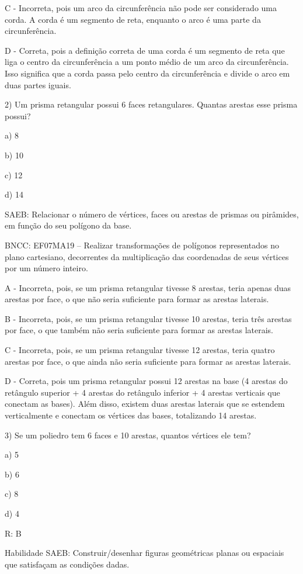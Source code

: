 C - Incorreta, pois um arco da circunferência não pode ser considerado
uma corda. A corda é um segmento de reta, enquanto o arco é uma parte da
circunferência.

D - Correta, pois a definição correta de uma corda é um segmento de reta
que liga o centro da circunferência a um ponto médio de um arco da
circunferência. Isso significa que a corda passa pelo centro da
circunferência e divide o arco em duas partes iguais.

2) Um prisma retangular possui 6 faces retangulares. Quantas arestas
esse prisma possui?

a) 8

b) 10

c) 12

d) 14

SAEB: Relacionar o número de vértices, faces ou arestas de prismas ou
pirâmides, em função do seu polígono da base.

BNCC: EF07MA19 -- Realizar transformações de polígonos representados no
plano cartesiano, decorrentes da multiplicação das coordenadas de seus
vértices por um número inteiro.

A - Incorreta, pois, se um prisma retangular tivesse 8 arestas, teria
apenas duas arestas por face, o que não seria suficiente para formar as
arestas laterais.

B - Incorreta, pois, se um prisma retangular tivesse 10 arestas, teria
três arestas por face, o que também não seria suficiente para formar as
arestas laterais.

C - Incorreta, pois, se um prisma retangular tivesse 12 arestas, teria
quatro arestas por face, o que ainda não seria suficiente para formar as
arestas laterais.

D - Correta, pois um prisma retangular possui 12 arestas na base (4
arestas do retângulo superior + 4 arestas do retângulo inferior + 4
arestas verticais que conectam as bases). Além disso, existem duas
arestas laterais que se estendem verticalmente e conectam os vértices
das bases, totalizando 14 arestas.

3) Se um poliedro tem 6 faces e 10 arestas, quantos vértices ele tem?

a) 5

b) 6

c) 8

d) 4

R: B

Habilidade SAEB: Construir/desenhar figuras geométricas planas ou
espaciais que satisfaçam as condições dadas.

